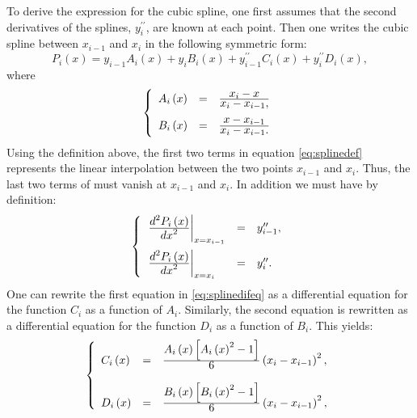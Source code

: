 To derive the expression for the cubic spline, one first assumes
that the second derivatives of the splines, $y^{\prime\prime}_i$,
are known at each point. Then one writes the cubic spline between
$x_{i-1}$ and $x_i$ in the following symmetric form:
\begin{equation}
\label{eq:splinedef} P_i\left(x\right)=y_{i-1}A_i\left(x\right) +
y_i B_i\left(x\right) + y^{\prime\prime}_{i-1}C_i\left(x\right) +
y^{\prime\prime}_i D_i\left(x\right),
\end{equation}
where
\begin{equation}
\label{eq:splinelin}  \left\{
  \begin{array}{lcl}
    A_i\left(x\right) & = & \displaystyle x_i - x \over\displaystyle x_i - x_{i-1}, \\*[2 ex]
    B_i\left(x\right) & = & \displaystyle x - x_{i-1} \over\displaystyle x_i - x_{i-1}.
  \end{array}\right.
\end{equation}
Using the definition above, the first two terms in equation
\ref{eq:splinedef} represents the linear interpolation between the
two points $x_{i-1}$ and $x_i$. Thus, the last two terms of must
vanish at $x_{i-1}$ and $x_i$. In addition we must have by
definition:
\begin{equation}
\label{eq:splinedifeq}
 \left\{
  \begin{array}{lcl}
    \left.{\displaystyle d^2P_i\left(x\right)\over\displaystyle dx^2}\right|_{x=x_{i-1}} & = &
    y^{\prime\prime}_{i-1},
    \\*[3 ex]
    \left.{\displaystyle d^2P_i\left(x\right)\over\displaystyle dx^2}\right|_{x=x_i} & = &
    y^{\prime\prime}_i.
  \end{array} \right.
\end{equation}
One can rewrite the first equation in \ref{eq:splinedifeq} as a
differential equation for the function $C_i$ as a function of
$A_i$. Similarly, the second equation is rewritten as a
differential equation for the function $D_i$ as a function of
$B_i$. This yields:
\begin{equation}
\label{eq:splinecub}
 \left\{
  \begin{array}{lcl}
    C_i\left(x\right) & = &
    {\displaystyle A_i\left(x\right)\left[A_i\left(x\right)^2-1\right]\over\displaystyle 6} \left(x_i - x_{i-1}\right)^2,
    \\*[3 ex]
    D_i\left(x\right) & = &
    {\displaystyle B_i\left(x\right)\left[B_i\left(x\right)^2-1\right]\over\displaystyle 6} \left(x_i - x_{i-1}\right)^2,
  \end{array} \right.
\end{equation}
